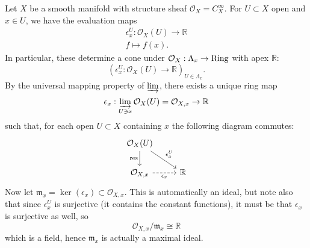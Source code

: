 \documentclass[12pt]{article}
\begin{document}
\begin{example}
	Let $X$ be a smooth manifold with structure sheaf $\mathcal{O}_X=C^\infty_X$. For $U\subset X$ open and $x\in U$, we have the evaluation maps 
	\begin{gather*}
		\epsilon^U_x:\mathcal{O}_X(U) \to \mathbb{R} \\
		f \mapsto f(x).
	\end{gather*}
	In particular, these determine a cone under $\mathcal{O}_X:\Lambda_x\to\text{Ring}$ with apex $\mathbb{R}$:
	\begin{equation*}
		(\epsilon_x^U:\mathcal{O}_X(U)\to\mathbb{R})_{U\in\Lambda_x}.
	\end{equation*}
	By the universal mapping property of $\varinjlim$, there exists a unique ring map 
	\begin{equation*}
		\epsilon_x:\varinjlim_{U\ni x}\mathcal{O}_X(U) = \mathcal{O}_{X,x}\to\mathbb{R}
	\end{equation*}
	such that, for each open $U\subset X$ containing $x$ the following diagram commutes:
	\begin{equation*}
\begin{tikzcd}
\mathcal{O}_X(U) \arrow[rd, "\epsilon^U_x"] \arrow[d, "\text{res}"'] &            \\
{\mathcal{O}_{X,x}} \arrow[r, "\epsilon_x"', dashed]                 & \mathbb{R}
\end{tikzcd}
	\end{equation*}
	Now let $\mathfrak{m}_x=\ker(\epsilon_x)\subset\mathcal{O}_{X,x}$. This is automatically an ideal, but note also that since $\epsilon_x^U$ is surjective (it contains the constant functions), it must be that $\epsilon_x$ is surjective as well, so 
	\begin{equation*}
		\mathcal{O}_{X,x} / \mathfrak{m}_x \cong\mathbb{R}
	\end{equation*}
	which is a field, hence $\mathfrak{m}_x$ is actually a maximal ideal. 


\end{example}
\end{document}
